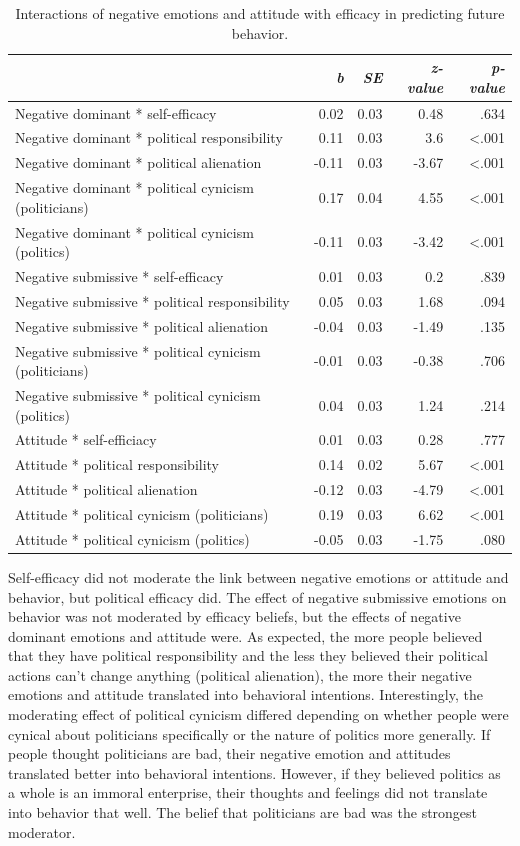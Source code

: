 \documentclass[
]{article}
\begin{document}
\begin{table}[H]
\centering
\caption{\label{tab:TableS6}Interactions of negative emotions and attitude with efficacy in predicting future behavior.}
\centering
\fontsize{8}{10}\selectfont
\begin{tabular}[t]{lrrrr}
\toprule
\em{ } & \em{b} & \em{SE} & \em{z-value} & \em{p-value}\\
\midrule
Negative dominant * self-efficacy & 0.02 & 0.03 & 0.48 & .634\\
Negative dominant * political responsibility & 0.11 & 0.03 & 3.6 & <.001\\
Negative dominant * political alienation & -0.11 & 0.03 & -3.67 & <.001\\
Negative dominant * political cynicism (politicians) & 0.17 & 0.04 & 4.55 & <.001\\
Negative dominant * political cynicism (politics) & -0.11 & 0.03 & -3.42 & <.001\\
Negative submissive * self-efficacy & 0.01 & 0.03 & 0.2 & .839\\
Negative submissive * political responsibility & 0.05 & 0.03 & 1.68 & .094\\
Negative submissive * political alienation & -0.04 & 0.03 & -1.49 & .135\\
Negative submissive * political cynicism (politicians) & -0.01 & 0.03 & -0.38 & .706\\
Negative submissive * political cynicism (politics) & 0.04 & 0.03 & 1.24 & .214\\
Attitude * self-efficiacy & 0.01 & 0.03 & 0.28 & .777\\
Attitude * political responsibility & 0.14 & 0.02 & 5.67 & <.001\\
Attitude * political alienation & -0.12 & 0.03 & -4.79 & <.001\\
Attitude * political cynicism (politicians) & 0.19 & 0.03 & 6.62 & <.001\\
Attitude * political cynicism (politics) & -0.05 & 0.03 & -1.75 & .080\\
\bottomrule
\end{tabular}
\end{table}

Self-efficacy did not moderate the link between negative emotions or attitude and behavior, but political efficacy did. The effect of negative submissive emotions on behavior was not moderated by efficacy beliefs, but the effects of negative dominant emotions and attitude were. As expected, the more people believed that they have political responsibility and the less they believed their political actions can't change anything (political alienation), the more their negative emotions and attitude translated into behavioral intentions. Interestingly, the moderating effect of political cynicism differed depending on whether people were cynical about politicians specifically or the nature of politics more generally. If people thought politicians are bad, their negative emotion and attitudes translated better into behavioral intentions. However, if they believed politics as a whole is an immoral enterprise, their thoughts and feelings did not translate into behavior that well. The belief that politicians are bad was the strongest moderator.
\end{document}
